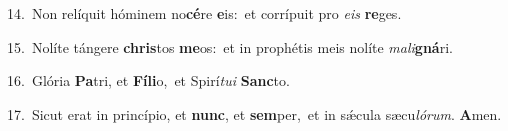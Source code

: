 {\numbfont\textcolor{\numbcolor}{14.}}~Non relíquit hóminem no\-\textbf{cé}\-re \textbf{e}\-is:~\star et corrípuit pro \textit{e}\-\textit{is} \textbf{re}\-ges.\par
{\numbfont\textcolor{\numbcolor}{15.}}~Nolíte tángere \textbf{chris}\-tos \textbf{me}\-os:~\star et in prophétis meis nolíte \textit{ma}\-\textit{li}\textbf{gná}ri.\par
{\numbfont\textcolor{\numbcolor}{16.}}~Glória \textbf{Pa}\-tri, et \textbf{Fí}\-\textbf{li}o,~\star et Spirí\-\textit{tu}\-\textit{i} \textbf{Sanc}\-to.\par
{\numbfont\textcolor{\numbcolor}{17.}}~Sicut erat in princípio, et \textbf{nunc}\-, et \textbf{sem}\-per,~\star et in sǽcula sæcu\-\textit{ló}\-\textit{rum}. \textbf{A}\-men.\par
